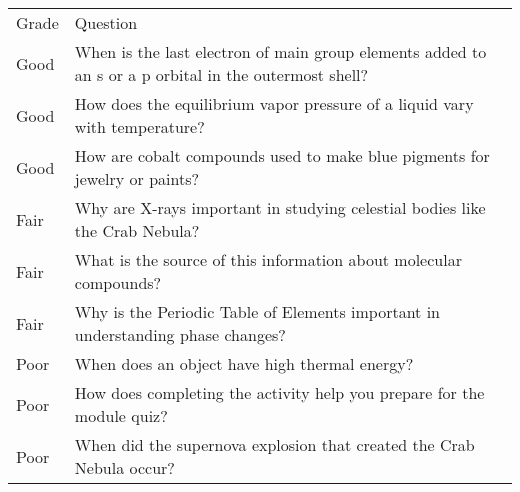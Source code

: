 \begin{tabular}{ll}
Grade & Question \\
Good & When is the last electron of main group elements added to an s or a p orbital in the outermost shell? \\
Good & How does the equilibrium vapor pressure of a liquid vary with temperature? \\
Good & How are cobalt compounds used to make blue pigments for jewelry or paints? \\
Fair &  Why are X-rays important in studying celestial bodies like the Crab Nebula? \\
Fair & What is the source of this information about molecular compounds? \\
Fair &  Why is the Periodic Table of Elements important in understanding phase changes? \\
Poor & When does an object have high thermal energy? \\
Poor & How does completing the activity help you prepare for the module quiz? \\
Poor &  When did the supernova explosion that created the Crab Nebula occur? \\
\end{tabular}

